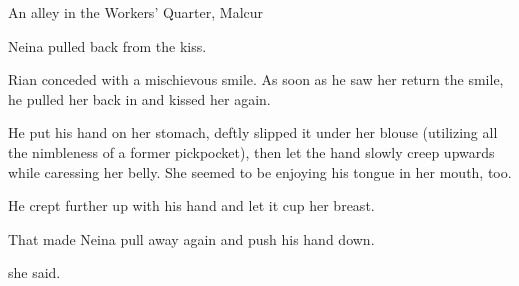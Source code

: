 \begin{comment}
\section{Rian and Neina}
\end{comment}
\stamp
  {\dateNeinaCaptured}
  {An alley in the Workers' Quarter, Malcur}

% 
% 
% 
Neina pulled back from the kiss. 

 Rian conceded with a mischievous smile. 
As soon as he saw her return the smile, he pulled her back in and kissed her again. 


He put his hand on her stomach, deftly slipped it under her blouse (utilizing all the nimbleness of a former pickpocket), then let the hand slowly creep upwards while caressing her belly. 
She seemed to be enjoying his tongue in her mouth, too. 


He crept further up with his hand and let it cup her breast. 

That made Neina pull away again and push his hand down. 


 she said. 

